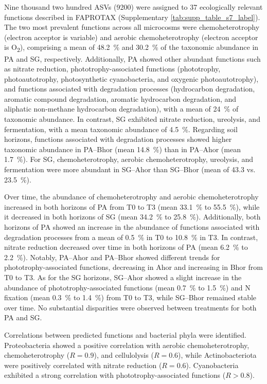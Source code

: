 Nine thousand two hundred ASVs (\num{9200}) were assigned to 37 ecologically relevant functions described in FAPROTAX (Supplementary \cref{tab:supp_table_s7_label}). The two most prevalent functions across all microcosms were chemoheterotrophy (electron acceptor is variable) and aerobic chemoheterotrophy (electron acceptor is O\textsubscript{2}), comprising a mean of \SI{48.2}{\percent} and \SI{30.2}{\percent} of the taxonomic abundance in PA and SG, respectively. Additionally, PA showed other abundant functions such as nitrate reduction, phototrophy-associated functions (phototrophy, photoautotrophy, photosynthetic cyanobacteria, and oxygenic photoautotrophy), and functions associated with degradation processes (hydrocarbon degradation, aromatic compound degradation, aromatic hydrocarbon degradation, and aliphatic non-methane hydrocarbon degradation), with a mean of \SI{24}{\percent} of taxonomic abundance. In contrast, SG exhibited nitrate reduction, ureolysis, and fermentation, with a mean taxonomic abundance of \SI{4.5}{\percent}. Regarding soil horizons, functions associated with degradation processes showed higher taxonomic abundance in PA--Bhor (mean \SI{14.8}{\percent}) than in PA--Ahor (mean \SI{1.7}{\percent}). For SG, chemoheterotrophy, aerobic chemoheterotrophy, ureolysis, and fermentation were more abundant in SG--Ahor than SG--Bhor (mean of 43.3 vs. \SI{23.5}{\percent}).

Over time, the abundance of chemoheterotrophy and aerobic chemoheterotrophy increased in both horizons of PA from T0 to T3 (mean \SI{33.1}{\percent} to \SI{55.5}{\percent}), while it decreased in both horizons of SG (mean \SI{34.2}{\percent} to \SI{25.8}{\percent}). Additionally, both horizons of PA showed an increase in the abundance of functions associated with degradation processes from a mean of \SI{0.5}{\percent} in T0 to \SI{10.8}{\percent} in T3. In contrast, nitrate reduction decreased over time in both horizons of PA (mean \SI{6.2}{\percent} to \SI{2.2}{\percent}). Notably, PA--Ahor and PA--Bhor showed different trends for phototrophy-associated functions, decreasing in Ahor and increasing in Bhor from T0 to T3. As for the SG horizons, SG--Ahor showed a slight increase in the abundance of phototrophy-associated functions (mean \SI{0.7}{\percent} to \SI{1.5}{\percent}) and N fixation (mean \SI{0.3}{\percent} to \SI{1.4}{\percent}) from T0 to T3, while SG--Bhor remained stable over time. No substantial disparities were observed between treatments for both PA and SG.

Correlations between predicted functions and bacterial phyla were identified. Proteobacteria showed a positive correlation with aerobic chemoheterotrophy, chemoheterotrophy (\(R=0.9\)), and cellulolysis (\(R=0.6\)), while Actinobacteriota were positively correlated with nitrate reduction (\(R=0.6\)). Cyanobacteria exhibited a strong correlation with phototrophy-associated functions (\(R > 0.8\)).

